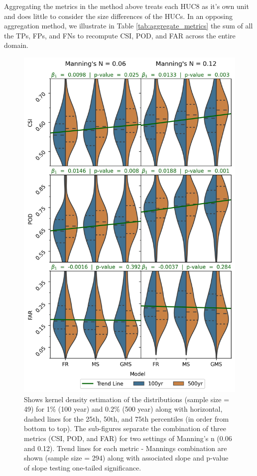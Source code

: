 Aggregating the metrics in the method above treats each HUC8 as it's own unit and does little to consider the size differences of the HUCs. 
In an opposing aggregation method, we illustrate in Table \ref{tab:aggregate_metrics} the sum of all the TPs, FPs, and FNs to recompute CSI, POD, and FAR across the entire domain. 
%
\begin{figure}[h!]
\centering
\includegraphics[scale=0.9]{figures/violin_plots.jpg}
\caption{Shows kernel density estimation of the distributions (sample size = 49) for 1\% (100 year) and 0.2\% (500 year) along with horizontal, dashed lines for the 25th, 50th, and 75th percentiles (in order from bottom to top).
The sub-figures separate the combination of three metrics (CSI, POD, and FAR) for two settings of Manning's n (0.06 and 0.12).
Trend lines for each metric - Mannings combination are shown (sample size = 294) along with associated slope and p-value of slope testing one-tailed significance.}
\label{fig:violin_plot}
\end{figure}
